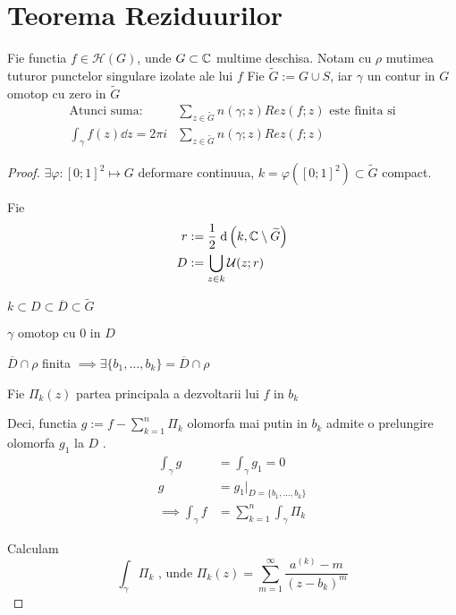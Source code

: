 \section{Teorema Reziduurilor}

\begin{theorem}
    Fie functia $f\in \mathcal{H}(G)$, unde $G \subset \mathbb{C}$ multime deschisa.
    Notam cu $\rho$  mutimea tuturor punctelor singulare izolate ale lui $f$
    Fie $\widetilde{G}:=G \cup S $, iar $\gamma$ un contur in $G$ omotop cu zero
     in $\widetilde{G}$
    \begin{align*}
        \text{Atunci suma: }
        &\sum_{z \in \widetilde{G}} {n(\gamma;z) Rez(f;z)}
        \text{ este finita si}  \\
        \int_{\gamma} f(z) \dd z = 2\pi i &\sum_{z \in \widetilde{G}} n(\gamma;z) Rez(f;z)
    \end{align*}
    \begin{proof}
        $\exists \varphi:[0;1]^2 \mapsto G$ deformare continuua,
        $k = \varphi ([0;1]^2) \subset \widetilde{G}$ compact.

        Fie
        \begin{align*}
            r &:= \frac{1}{2} \; \mathrm{d} \left(k, \mathbb{C} \setminus \widetilde{G}\right)
            \\
            D &:= \bigcup_{z\in k} \mathcal{U}(z;r)
        \end{align*}

        $k \subset D \subset \overline{D} \subset \widetilde{G}$

        $\gamma$ omotop cu $0$ in $D$

        $\overline{D} \cap \rho$ finita
                $\implies \exists \{b_1, \dotsc, b_k \} = \overline{D} \cap \rho$

        Fie $\Pi_{k}(z)$ partea principala a dezvoltarii lui $f$ in $b_k$

        Deci, functia $\displaystyle g := f - \sum_{k=1}^{n} \Pi_k$
        olomorfa mai putin in $b_k$ admite o prelungire olomorfa $g_1$ la $D$ .
        \begin{align*}
            \int_{\gamma}  g &= \int_{\gamma} g_1 = 0 \\
                           g &= g_1 |_{D=\{b_1, \dotsc, b_k\}}\\
            \implies \int_{\gamma} f &= \sum_{k=1}^{n} \int_{\gamma} \Pi_k
        \end{align*}

        Calculam
        \[
            \int_{\gamma} \Pi_k \text{ , unde }
            \Pi_k(z) = \sum_{m=1}^{\infty} \frac{a^{(k)} - m }{(z - b_k)^m}
        \]


\end{proof}
\end{theorem}
